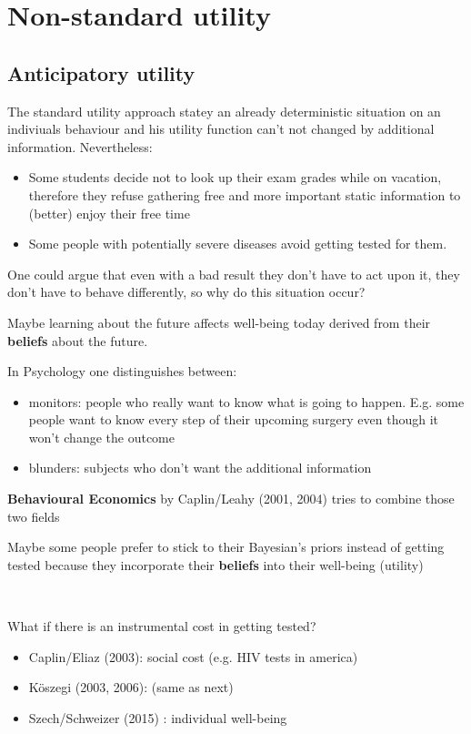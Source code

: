 
\chapter{Non-standard utility}


\section{Anticipatory utility}

The standard utility approach statey an already deterministic situation on an indiviuals behaviour and his utility function can't not changed by additional information. Nevertheless:

\begin{itemize}
	\item Some students decide not to look up their exam grades while on vacation, therefore they refuse gathering free and more important static information to (better) enjoy their free time
	\item Some people with potentially severe diseases avoid getting tested for them.
\end{itemize}

One could argue that even with a bad result they don't have to act upon it, they don't have to behave differently, so why do this situation occur? 

Maybe learning about the future affects well-being today derived from their \textbf{beliefs} about the future.

In Psychology one distinguishes between:
\begin{itemize}
	\item monitors: people who really want to know what is going to happen. E.g. some people want to know every step of their upcoming surgery even though it won't change the outcome
	\item blunders: subjects who don't want the additional information
\end{itemize}

\textbf{Behavioural Economics} by Caplin/Leahy (2001, 2004) tries to combine those two fields

Maybe some people prefer to stick to their Bayesian's priors instead of getting tested because they incorporate their \textbf{beliefs} into their well-being (utility)

~\newline

What if there is an instrumental cost in getting tested?
\begin{itemize}
	\item Caplin/Eliaz (2003): social cost (e.g. HIV tests in america)
	\item Köszegi (2003, 2006): (same as next)
	\item Szech/Schweizer (2015) : individual well-being
\end{itemize}

